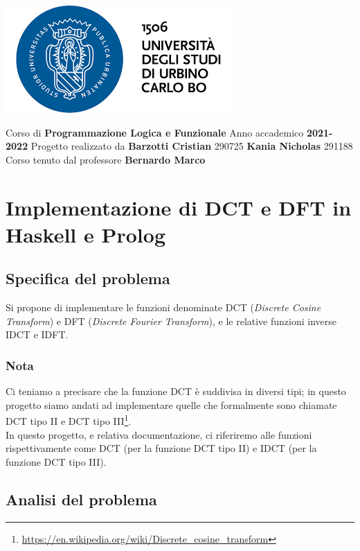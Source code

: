 \documentclass{report}
\begin{document}
	\centerline{\includegraphics{logo}}
	\bigbreak

	\begin{center}
		Corso di
        \vskip 0.2cm
		\large{\textbf{Programmazione Logica e Funzionale}}
		\vskip 2cm
		Anno accademico
        \vskip 0.2cm
 		\textbf{2021-2022}
		\vskip 2cm
		Progetto realizzato da
        \vskip 0.2cm
		\textbf{Barzotti Cristian}
        \vskip 0.1cm 290725
        \vskip 0.2cm
        \textbf{Kania Nicholas} 
        \vskip 0.1cm 
        291188
		\vfill
		Corso tenuto dal professore
        \vskip 0.2cm
		\large{\textbf{Bernardo Marco}}
	\end{center}
	
	\part*{Implementazione di DCT e DFT in Haskell e Prolog}
	\tableofcontents %

	
	\chapter{Specifica del problema}
	Si propone di implementare le funzioni denominate DCT
	(\textit{Discrete Cosine Transform}) e DFT (\textit{Discrete Fourier Transform}), 
	e le relative funzioni inverse IDCT e IDFT. \\
	\section*{Nota}
	Ci teniamo a precisare che la funzione DCT è suddivisa in diversi tipi; in questo progetto siamo andati ad implementare quelle che formalmente sono chiamate DCT tipo II e DCT tipo III\footnote{\url{https://en.wikipedia.org/wiki/Discrete_cosine_transform}}.\\ 
	In questo progetto, e relativa documentazione, ci riferiremo alle funzioni rispettivamente come DCT (per la funzione DCT tipo II) e IDCT (per la funzione DCT tipo III).
	
	\chapter{Analisi del problema}
\end{document}
